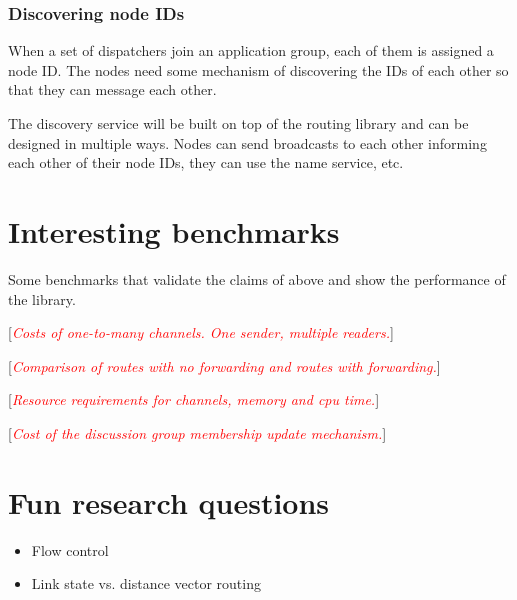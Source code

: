 \documentclass[a4paper,twoside]{report} %
\newcommand{\note}[1]{[\textcolor{red}{\textit{#1}}]}
\begin{document}
\subsection{Discovering node IDs}
When a set of dispatchers join an application group,
each of them is assigned a node ID.
The nodes need some mechanism of discovering the IDs of each other
so that they can message each other.

The discovery service will be built on top of the routing library
and can be designed in multiple ways.
Nodes can send broadcasts to each other informing each other of their node IDs,
they can use the name service, etc.

\chapter{Interesting benchmarks}\label{chap:benchmarks}

Some benchmarks that validate the claims of above and show the performance of the library.

\note{Costs of one-to-many channels. One sender, multiple readers.}

\note{Comparison of routes with no forwarding and routes with forwarding.}

\note{Resource requirements for channels, memory and cpu time.}

\note{Cost of the discussion group membership update mechanism.}

\chapter{Fun research questions}

\begin{itemize}
\item Flow control
\item Link state vs. distance vector routing
\end{itemize}



\end{document}
